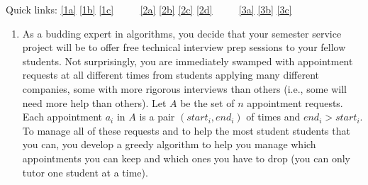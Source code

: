 \documentclass[12pt]{article}
\begin{document}
\renewcommand{\headrulewidth}{0.5pt}
\phantom{Test}

Quick links: \ref{1a} \ref{1b} \ref{1c} $\qquad$ \ref{2a} \ref{2b} \ref{2c} \ref{2d} $\qquad$ \ref{3a} \ref{3b} \ref{3c} 

\vspace{-3mm}
\begin{enumerate}

\item %
As a budding expert in algorithms, you decide that your semester service
project will be to offer free technical interview prep sessions to your fellow
students. Not surprisingly, you are immediately swamped with appointment
requests at all different times from students applying many
different companies, some with more rigorous interviews than others
(i.e., some will need more help than others). Let $A$ be the set of $n$
appointment requests. Each appointment $a_i$ in $A$ is a pair 
$(start_i, end_i)$ of times and $end_i>start_i$. To manage all of these
requests and to help the most student students that you can, you
develop a greedy algorithm to help you manage which appointments you can keep
and which ones you have to drop (you can only tutor one student at a
time).  


\end{enumerate}
\end{document}
